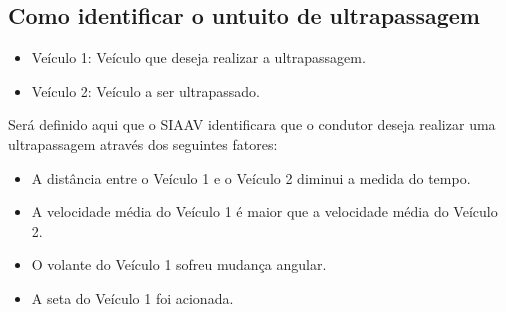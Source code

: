 \subsection{Como identificar o untuito de ultrapassagem}

\begin{itemize}
  \item Veículo 1: Veículo que deseja realizar a ultrapassagem.
  \item Veículo 2: Veículo a ser ultrapassado.
\end{itemize}

Será definido aqui que o SIAAV identificara que o condutor deseja realizar uma ultrapassagem através dos seguintes fatores:

\begin{itemize}
  \item A distância entre o Veículo 1 e o Veículo 2 diminui a medida do tempo.
  \item A velocidade média do Veículo 1 é maior que a velocidade média do Veículo 2.
  \item O volante do Veículo 1 sofreu mudança angular.
  \item A seta do Veículo 1 foi acionada.
\end{itemize}

